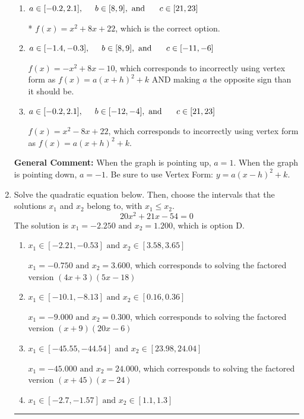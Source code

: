 \documentclass{extbook}[14pt]
\newcommand{\litem}[1]{\item #1

\rule{\textwidth}{0.4pt}}
\begin{document}
\begin{enumerate}
{\begin{enumerate}[label=\Alph*.]
$f(x)=-x^{2} -8 x -10$, which corresponds to making $a$ the opposite sign than it should be.
\item \( a \in [-0.2, 2.1], \hspace*{5mm} b \in [8, 9], \text{ and } \hspace*{5mm} c \in [21, 23] \)

* $f(x)=x^{2} +8 x + 22$, which is the correct option.
\item \( a \in [-1.4, -0.3], \hspace*{5mm} b \in [8, 9], \text{ and } \hspace*{5mm} c \in [-11, -6] \)

$f(x)=-x^{2} +8 x -10$, which corresponds to incorrectly using vertex form as $f(x) = a(x+h)^2+k$ AND making $a$ the opposite sign than it should be.
\item \( a \in [-0.2, 2.1], \hspace*{5mm} b \in [-12, -4], \text{ and } \hspace*{5mm} c \in [21, 23] \)

$f(x)=x^{2} -8 x + 22$, which corresponds to incorrectly using vertex form as $f(x) = a(x+h)^2+k$.
\end{enumerate}

\textbf{General Comment:} When the graph is pointing up, $a=1$. When the graph is pointing down, $a=-1$. Be sure to use Vertex Form: $y = a(x-h)^2+k$.
}
\litem{
Solve the quadratic equation below. Then, choose the intervals that the solutions $x_1$ and $x_2$ belong to, with $x_1 \leq x_2$.
\[ 20x^{2} +21 x -54 = 0 \]The solution is \( x_1 = -2.250 \text{ and } x_2 = 1.200 \), which is option D.\begin{enumerate}[label=\Alph*.]
\item \( x_1 \in [-2.21, -0.53] \text{ and } x_2 \in [3.58, 3.65] \)

$x_1 = -0.750 \text{ and } x_2 = 3.600$, which corresponds to solving the factored version $(4x + 3)(5x -18)$
\item \( x_1 \in [-10.1, -8.13] \text{ and } x_2 \in [0.16, 0.36] \)

$x_1 = -9.000 \text{ and } x_2 = 0.300$, which corresponds to solving the factored version $(x + 9)(20x -6)$
\item \( x_1 \in [-45.55, -44.54] \text{ and } x_2 \in [23.98, 24.04] \)

$x_1 = -45.000 \text{ and } x_2 = 24.000$, which corresponds to solving the factored version $(x + 45)(x -24)$
\item \( x_1 \in [-2.7, -1.57] \text{ and } x_2 \in [1.1, 1.3] \)


\end{enumerate}}
\end{enumerate}
\end{document}
